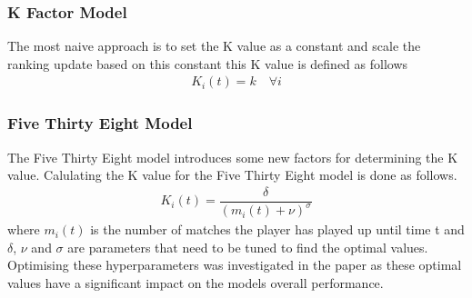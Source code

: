 \documentclass[12pt,a4paper]{article}
\begin{document}
\subsubsection{K Factor Model}
The most naive approach is to set the K value as a constant and scale the ranking
update based on this constant this K value is defined as follows
\begin{gather}
  K_i(t) = k \quad \forall i
\end{gather}
\subsubsection{Five Thirty Eight Model}
The Five Thirty Eight model introduces some new factors for determining the K
value. Calulating the K value for the Five Thirty Eight model is done as follows.
\begin{gather}
  K_i(t) = \dfrac{\delta}{{(m_i(t) + \nu)}^{\sigma}}
\end{gather}
where $m_i(t)$ is the number of matches the player has played up until time t and
$\delta$, $\nu$ and $\sigma$ are parameters that need to be tuned to find the
optimal values. Optimising these hyperparameters was investigated in the paper as
these optimal values have a significant impact on the models overall performance.
\end{document}
